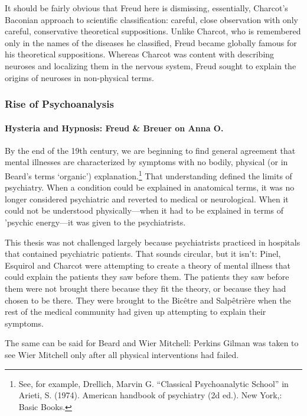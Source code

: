 It should be fairly obvious that Freud here is dismissing, essentially, Charcot's Baconian approach to scientific classification: careful, close observation with only careful, conservative theoretical suppositions. Unlike Charcot, who is remembered only in the names of the diseases he classified, Freud became globally famous for his theoretical suppositions. Whereas Charcot was content with describing neuroses and localizing them in the nervous system, Freud sought to explain the origins of neuroses in non-physical terms.

\subsubsection{Rise of Psychoanalysis}
\label{riseofpsychoanalysis}

\paragraph{Hysteria and Hypnosis: Freud \& Breuer on Anna O.}
\label{hysteriaandhypnosis:freudbreueronannao.}

By the end of the 19th century, we are beginning to find general agreement that mental illnesses are characterized by symptoms with no bodily, physical (or in Beard's terms `organic') explanation.\footnote{See, for example, Drellich, Marvin G. “Classical Psychoanalytic School” in Arieti, S. (1974). American handbook of psychiatry (2d ed.). New York,: Basic Books.} That understanding defined the limits of psychiatry. When a condition could be explained in anatomical terms, it was no longer considered psychiatric and reverted to medical or neurological. When it could not be understood physically---when it had to be explained in terms of 'psychic energy---it was given to the psychiatrists.

This thesis was not challenged largely because psychiatrists practiced in hospitals that contained psychiatric patients. That sounds circular, but it isn't: Pinel, Esquirol and Charcot were attempting to create a theory of mental illness that could explain the patients they saw before them. The patients they saw before them were not brought there because they fit the theory, or because they had chosen to be there. They were brought to the Bicêtre and Salpêtrière when the rest of the medical community had given up attempting to explain their symptoms.

The same can be said for Beard and Wier Mitchell: Perkins Gilman was taken to see Wier Mitchell only after all physical interventions had failed.

